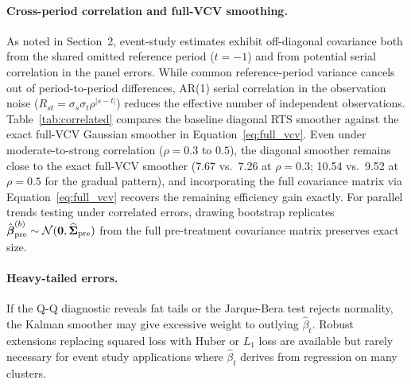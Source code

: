 \documentclass[12pt]{article}
\begin{document}
\begin{table}[H]
\centering
\caption{Robustness to Adversarial DGPs ($N = 200$, $\sigma = 1$, 1{,}000 simulations)}\label{tab:adversarial}

\end{table}

\paragraph{Cross-period correlation and full-VCV smoothing.} As noted in Section~2, event-study estimates exhibit off-diagonal covariance both from the shared omitted reference period ($t = -1$) and from potential serial correlation in the panel errors. While common reference-period variance cancels out of period-to-period differences, AR(1) serial correlation in the observation noise ($R_{st} = \sigma_s \sigma_t \rho^{|s-t|}$) reduces the effective number of independent observations. Table~\ref{tab:correlated} compares the baseline diagonal RTS smoother against the exact full-VCV Gaussian smoother in Equation~\eqref{eq:full_vcv}. Even under moderate-to-strong correlation ($\rho = 0.3$ to $0.5$), the diagonal smoother remains close to the exact full-VCV smoother (7.67 vs.\ 7.26 at $\rho = 0.3$; 10.54 vs.\ 9.52 at $\rho = 0.5$ for the gradual pattern), and incorporating the full covariance matrix via Equation~\eqref{eq:full_vcv} recovers the remaining efficiency gain exactly. For parallel trends testing under correlated errors, drawing bootstrap replicates $\hat{\boldsymbol\beta}^{(b)}_{\rm pre} \sim \mathcal{N}(\mathbf{0}, \widehat{\boldsymbol\Sigma}_{\rm pre})$ from the full pre-treatment covariance matrix preserves exact size.

\begin{table}[H]
\centering
\caption{Diagonal vs.\ Exact Full-VCV Smoother Under AR(1) Correlated Errors (Level MSE $\times 10^3$, $N = 200$, $\sigma = 1$)}\label{tab:correlated}

\end{table}

\paragraph{Heavy-tailed errors.} If the Q-Q diagnostic reveals fat tails or the Jarque-Bera test rejects normality, the Kalman smoother may give excessive weight to outlying $\hat{\beta}_t$. Robust extensions replacing squared loss with Huber or $L_1$ loss are available \citep[see][Chapter 9]{durbin2012time} but rarely necessary for event study applications where $\hat{\beta}_t$ derives from regression on many clusters.
\end{document}
